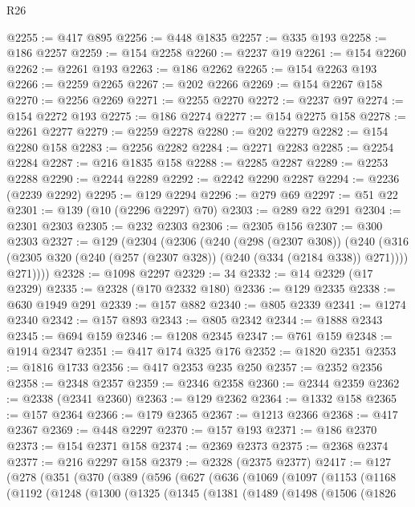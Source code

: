 \begin{lexlean}{R26}
\begin{coremodule}
@2255 := @417 @895
@2256 := @448 @1835
@2257 := @335 @193
@2258 := @186 @2257
@2259 := @154 @2258
@2260 := @2237 @19
@2261 := @154 @2260
@2262 := @2261 @193
@2263 := @186 @2262
@2265 := @154 @2263 @193
@2266 := @2259 @2265
@2267 := @202 @2266
@2269 := @154 @2267 @158
@2270 := @2256 @2269
@2271 := @2255 @2270
@2272 := @2237 @97
@2274 := @154 @2272 @193
@2275 := @186 @2274
@2277 := @154 @2275 @158
@2278 := @2261 @2277
@2279 := @2259 @2278
@2280 := @202 @2279
@2282 := @154 @2280 @158
@2283 := @2256 @2282
@2284 := @2271 @2283
@2285 := @2254 @2284
@2287 := @216 @1835 @158
@2288 := @2285 @2287
@2289 := @2253 @2288
@2290 := @2244 @2289
@2292 := @2242 @2290 @2287
@2294 := @2236 (@2239 @2292)
@2295 := @129 @2294
@2296 := @279 @69
@2297 := @51 @22
@2301 := @139 (@10 (@2296 @2297) @70)
@2303 := @289 @22 @291
@2304 := @2301 @2303
@2305 := @232 @2303
@2306 := @2305 @156
@2307 := @300 @2303
@2327 := @129
    (@2304
      (@2306
        (@240
          (@298 (@2307 @308))
          (@240
            (@316 (@2305 @320 (@240 (@257 (@2307 @328)) (@240 (@334 (@2184 @338)) @271))))
            @271))))
@2328 := @1098 @2297
@2329 := 34
@2332 := @14 @2329 (@17 @2329)
@2335 := @2328 (@170 @2332 @180)
@2336 := @129 @2335
@2338 := @630 @1949 @291
@2339 := @157 @882
@2340 := @805 @2339
@2341 := @1274 @2340
@2342 := @157 @893
@2343 := @805 @2342
@2344 := @1888 @2343
@2345 := @694 @159
@2346 := @1208 @2345
@2347 := @761 @159
@2348 := @1914 @2347
@2351 := @417 @174 @325 @176
@2352 := @1820 @2351
@2353 := @1816 @1733
@2356 := @417 @2353 @235 @250
@2357 := @2352 @2356
@2358 := @2348 @2357
@2359 := @2346 @2358
@2360 := @2344 @2359
@2362 := @2338 (@2341 @2360)
@2363 := @129 @2362
@2364 := @1332 @158
@2365 := @157 @2364
@2366 := @179 @2365
@2367 := @1213 @2366
@2368 := @417 @2367
@2369 := @448 @2297
@2370 := @157 @193
@2371 := @186 @2370
@2373 := @154 @2371 @158
@2374 := @2369 @2373
@2375 := @2368 @2374
@2377 := @216 @2297 @158
@2379 := @2328 (@2375 @2377)
@2417 := @127
    (@278
      (@351
        (@370
          (@389
            (@596
              (@627
                (@636
                  (@1069
                    (@1097
                      (@1153
                        (@1168
                          (@1192
                            (@1248
                              (@1300
                                (@1325
                                  (@1345
                                    (@1381
                                      (@1489
                                        (@1498
                                          (@1506
                                            (@1826

\end{coremodule}
\end{lexlean}
